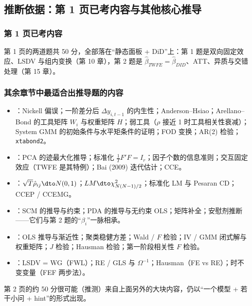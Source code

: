 \subsection{推断依据：第 1 页已考内容与其他核心推导}

\subsubsection{第 1 页已考内容}

第 1 页的两道题共 50 分，全部落在“静态面板 + DiD”上：第 1 题是双向固定效应、LSDV 与组内变换（第 10 章），第 2 题是 $\hat\beta_{TWFE}=\hat\beta_{DID}$、ATT、异质与交错处理（第 15 章）。

\subsubsection{其余章节中最适合出推导题的内容}

\begin{itemize}
  \item {}：Nickell 偏误；一阶差分后 $\Delta y_{i,t-1}$ 的内生性；Anderson--Hsiao；Arellano--Bond 的工具矩阵 $W_i$ 与权重矩阵 $H$；弱工具（$\rho$ 接近 1 时工具相关性衰减）；System GMM 的初始条件与水平矩条件的证明；FOD 变换；AR(2) 检验；\texttt{xtabond2}。
  \item {}：PCA 的迹最大化推导；标准化 $\frac1TF'F=I_r$；因子个数的信息准则；交互固定效应（TWFE 是其特例）；Bai (2009) 迭代估计；CCE。
  \item {}：$\sqrt T\hat\rho_{ij}\dto N(0,1)$；$LM\dto\chi^2_{N(N-1)/2}$；标准化 LM 与 Pesaran CD；CCEP / CCEMG。
  \item {}：SCM 的推导与约束；PDA 的推导与无约束 OLS；矩阵补全；安慰剂推断——它们与第 2 题的“$\beta_i$”一脉相承。
  \item {}：OLS 推导与渐近性；聚类稳健方差；Wald / $F$ 检验；IV / GMM 闭式解与权重矩阵；$J$ 检验；Hausman 检验；第一阶段相关性 $F$ 检验。
  \item {}：LSDV = WG（FWL）；RE / GLS 与 $\Omega^{-1}$；Hausman（FE vs RE）；时不变变量（FEF 两步法）。
\end{itemize}
第 2 页的约 50 分很可能（推测）来自上面另外的大块内容，仍以“一个模型 + 若干小问 + hint”的形式出现。

